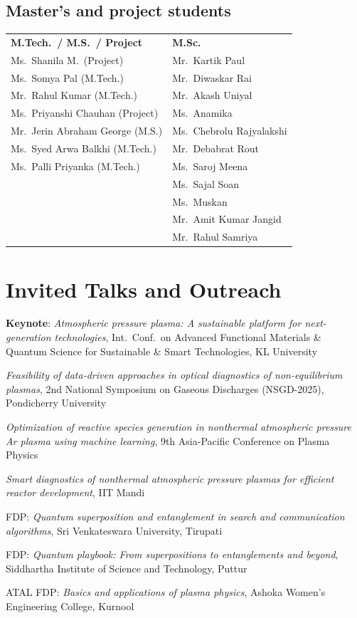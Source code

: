 \documentclass[11pt,a4paper]{article}
\newcommand{\sectionnb}[1]{\section*{#1}}   %
\newlength{\datew}\setlength{\datew}{2.75cm}
\newcommand{\dated}[2]{%
  \begin{list}{}{\setlength{\leftmargin}{\datew}\setlength{\labelwidth}{\datew}%
    \setlength{\labelsep}{0pt}\setlength{\topsep}{0pt}\setlength{\partopsep}{0pt}%
    \setlength{\itemsep}{0pt}\setlength{\parsep}{0pt}}
  \item[{\makebox[\datew][l]{\small\color{Muted}#1}}]#2
  \end{list}\vspace{3.5pt}}
\begin{document}
\subsection*{Master's and project students}
{\small
\renewcommand{\arraystretch}{1.12}
\begin{tabularx}{\linewidth}{@{\hspace{\datew}}X X@{}}
\textbf{\sffamily\color{Ink}M.Tech.\ / M.S.\ / Project} & \textbf{\sffamily\color{Ink}M.Sc.} \\[1pt]
Ms.\ Shanila M.\ (Project)          & Mr.\ Kartik Paul \\
Ms.\ Somya Pal (M.Tech.)            & Mr.\ Diwaskar Rai \\
Mr.\ Rahul Kumar (M.Tech.)          & Mr.\ Akash Uniyal \\
Ms.\ Priyanshi Chauhan (Project)    & Ms.\ Anamika \\
Mr.\ Jerin Abraham George (M.S.)    & Ms.\ Chebrolu Rajyalakshi \\
Ms.\ Syed Arwa Balkhi (M.Tech.)     & Mr.\ Debabrat Rout \\
Ms.\ Palli Priyanka (M.Tech.)       & Ms.\ Saroj Meena \\
                                    & Ms.\ Sajal Soan \\
                                    & Ms.\ Muskan \\
                                    & Mr.\ Amit Kumar Jangid \\
                                    & Mr.\ Rahul Samriya \\
\end{tabularx}}

\sectionnb{Invited Talks and Outreach}
\dated{Apr 2026}{\textbf{Keynote}: \emph{Atmospheric pressure plasma: A sustainable platform for next-generation technologies}, Int.\ Conf.\ on Advanced Functional Materials \& Quantum Science for Sustainable \& Smart Technologies, KL University}
\dated{Dec 2025}{\emph{Feasibility of data-driven approaches in optical diagnostics of non-equilibrium plasmas}, 2nd National Symposium on Gaseous Discharges (NSGD-2025), Pondicherry University}
\dated{Sep 2025}{\emph{Optimization of reactive species generation in nonthermal atmospheric pressure Ar plasma using machine learning}, 9th Asia-Pacific Conference on Plasma Physics}
\dated{May 2025}{\emph{Smart diagnostics of nonthermal atmospheric pressure plasmas for efficient reactor development}, IIT Mandi}
\dated{Mar 2026}{FDP: \emph{Quantum superposition and entanglement in search and communication algorithms}, Sri Venkateswara University, Tirupati}
\dated{Dec 2025}{FDP: \emph{Quantum playbook: From superpositions to entanglements and beyond}, Siddhartha Institute of Science and Technology, Puttur}
\dated{Sep 2025}{ATAL FDP: \emph{Basics and applications of plasma physics}, Ashoka Women's Engineering College, Kurnool}
\end{document}
